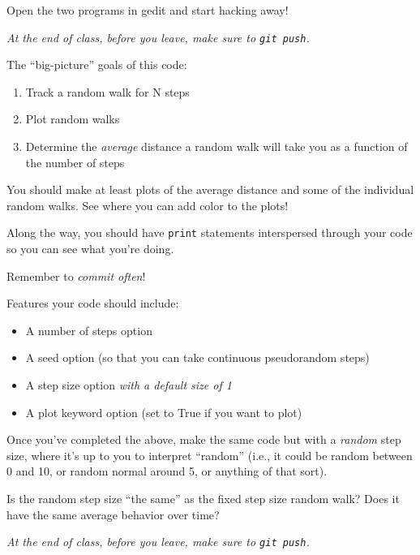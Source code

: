 \documentclass{article}
\begin{document}
\begin{spacing}{1.0}
Open the two programs in gedit and start hacking away!

\emph{At the end of class, before you leave, make sure to \texttt{git push}.}

The “big-picture” goals of this code:
\begin{enumerate}
    \item Track a random walk for N steps
    \item Plot random walks
    \item Determine the \emph{average} distance a random walk will take
        you as a function of the number of steps
\end{enumerate}

You should make at least plots of the average distance and some of the
individual random walks.  See where you can add color to the plots!

Along the way, you should have \verb|print| statements interspersed through
your code so you can see what you're doing.

Remember to \emph{commit often}!

Features your code should include:
\begin{itemize}
    \item A number of steps option
    \item A seed option (so that you can take continuous pseudorandom steps)
    \item A step size option \emph{with a default size of 1}
    \item A plot keyword option (set to True if you want to plot)
\end{itemize}

Once you've completed the above, make the same code but with a \emph{random}
step size, where it's up to you to interpret “random” (i.e., it could be random
between 0 and 10, or random normal around 5, or anything of that sort).

Is the random step size “the same” as the fixed step size random walk?  Does it have
the same average behavior over time?

\emph{At the end of class, before you leave, make sure to \texttt{git push}.}

\end{spacing}
\end{document}
